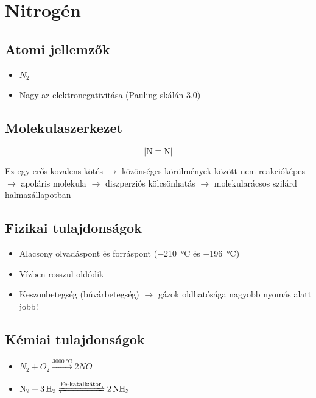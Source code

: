 \documentclass{article}
\begin{document}
\section{Nitrogén}
    \subsection{Atomi jellemzők}
        \begin{itemize}
            \item $N_2$
            \item Nagy az elektronegativitása (Pauling-skálán 3.0)
        \end{itemize}
        
    \subsection{Molekulaszerkezet}
    
        \[
        |\text{N} \equiv \text{N}|
        \]
        
        Ez egy erős kovalens kötés $\rightarrow$ közönséges körülmények között nem reakcióképes
        $\rightarrow$ apoláris molekula $\rightarrow$ diszperziós kölcsönhatás $\rightarrow$ molekularácsos szilárd halmazállapotban
    \subsection{Fizikai tulajdonságok}
        \begin{itemize}
            \item Alacsony olvadáspont és forráspont (\SI{-210}{\degreeCelsius} és \SI{-196}{\degreeCelsius})
            \item Vízben rosszul oldódik
            \item Keszonbetegség (búvárbetegség) $\rightarrow$ gázok oldhatósága nagyobb nyomás alatt jobb!
        \end{itemize}
    
    \subsection{Kémiai tulajdonságok}
        \begin{itemize}
            \item $N_2 + O_2 \xrightarrow{\SI{3000}{\degreeCelsius}} 2NO$
            \item \(\ce{N2 + 3 H2 <=>[\text{Fe-katalizátor}] 2 NH3}\)
        \end{itemize}
    
\end{document}
